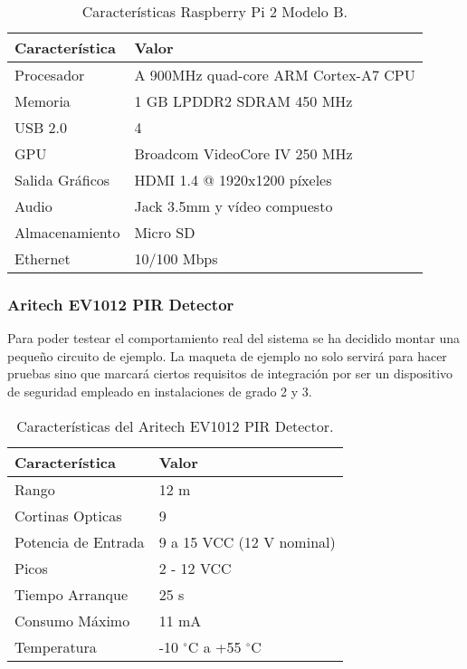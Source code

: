 \documentclass{pre-tfg}
\begin{document}
\begin{table}[h!]
  \centering
  \caption{Características Raspberry Pi 2 Modelo B. \cite{RaspberryPi2ModelB}}
  \label{tab:raspberrypi2}
  \begin{tabular}{p{}p{}}
    \hline
    \textbf{Característica} & \textbf{Valor} \\
    \hline
    Procesador & A 900MHz quad-core ARM Cortex-A7 CPU\\
    Memoria & 1 GB LPDDR2 SDRAM 450 MHz \\
    USB 2.0 & 4 \\
    GPU & Broadcom VideoCore IV 250 MHz \\
    Salida Gráficos & HDMI 1.4 @ 1920x1200 píxeles \\
    Audio & Jack 3.5mm y vídeo compuesto \\
    Almacenamiento & Micro SD \\
    Ethernet & 10/100 Mbps \\
    \hline
  \end{tabular}
\end{table}

\subsubsection{Aritech EV1012 PIR Detector}

Para poder testear  el comportamiento real del sistema  se ha decidido
montar una pequeño circuito de ejemplo.  La maqueta de ejemplo no solo
servirá  para hacer  pruebas sino  que marcará  ciertos requisitos  de
integración  por   ser  un   dispositivo  de  seguridad   empleado  en
instalaciones de grado 2 y 3.

\begin{table}[h!]
  \centering
  \caption{Características del Aritech EV1012 PIR Detector. \cite{EV1012}}
  \label{tab:ev1012}
  \begin{tabular}{p{}p{}}
    \hline
    \textbf{Característica} & \textbf{Valor} \\
    \hline
    Rango & 12 m\\
    Cortinas Opticas & 9  \\
    Potencia de Entrada & 9 a 15 VCC (12 V nominal)\\
    Picos & 2 - 12 VCC \\
    Tiempo Arranque & 25 s \\
    Consumo Máximo & 11 mA \\
    Temperatura & -10 $^{\circ}$C a +55 $^{\circ}$C\\
    \hline
  \end{tabular}
\end{table}
\end{document}
